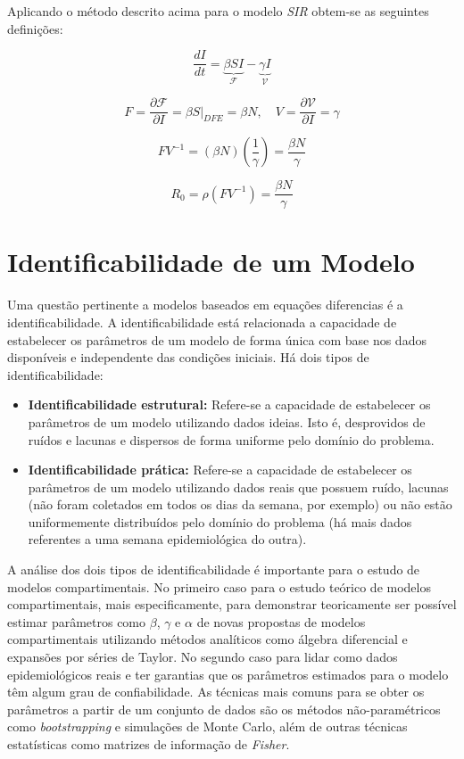 Aplicando o método descrito acima para o modelo \textit{SIR} obtem-se as seguintes
definições:

\begin{equation}
\frac{dI}{dt} = \underbrace{\beta SI}_{\mathcal{F}} - \underbrace{\gamma I}_{\mathcal{V}}
\end{equation}

\begin{equation}
F = \frac{\partial \mathcal{F}}{\partial I} = \beta S\big|_{DFE} = \beta N, \quad 
V = \frac{\partial \mathcal{V}}{\partial I} = \gamma
\end{equation}

\begin{equation}
FV^{-1} = (\beta N)\left(\frac{1}{\gamma}\right) = \frac{\beta N}{\gamma}
\end{equation}

\begin{equation}
R_0 = \rho(FV^{-1}) = \frac{\beta N}{\gamma}
\end{equation}


\section{Identificabilidade de um Modelo}

Uma questão pertinente a modelos baseados em equações diferencias é a 
identificabilidade. A identificabilidade está relacionada a capacidade de 
estabelecer os parâmetros de um modelo de forma única com base nos dados disponíveis
e independente das condições iniciais. Há dois tipos de identificabilidade:
\begin{itemize}
    \item \textbf{Identificabilidade estrutural:} Refere-se a capacidade de estabelecer
    os parâmetros de um modelo utilizando dados ideias. Isto é, desprovidos de ruídos
    e lacunas e dispersos de forma uniforme pelo domínio do problema. 
    \item \textbf{Identificabilidade prática:} Refere-se a capacidade de estabelecer
    os parâmetros de um modelo utilizando dados reais que possuem ruído, lacunas 
    (não foram coletados em todos os dias da semana, por exemplo) ou não estão uniformemente
    distribuídos pelo domínio do problema (há mais dados referentes a uma semana epidemiológica
    do outra).
\end{itemize}
A análise dos dois tipos de identificabilidade é importante para o estudo de 
modelos compartimentais. No primeiro caso para o estudo teórico de modelos 
compartimentais, mais especificamente, para demonstrar teoricamente ser possível 
estimar parâmetros como $\beta$, $\gamma$ e $\alpha$ de novas propostas de modelos 
compartimentais utilizando métodos analíticos como álgebra diferencial e 
expansões por séries de Taylor. 
No segundo caso para lidar como dados epidemiológicos reais e ter garantias que os
parâmetros estimados para o modelo têm algum grau de confiabilidade. As técnicas
mais comuns para se obter os parâmetros a partir de um conjunto de dados são os 
métodos não-paramétricos como \textit{bootstrapping} e simulações de Monte Carlo, 
além de outras técnicas estatísticas como matrizes de informação de \textit{Fisher}.  


